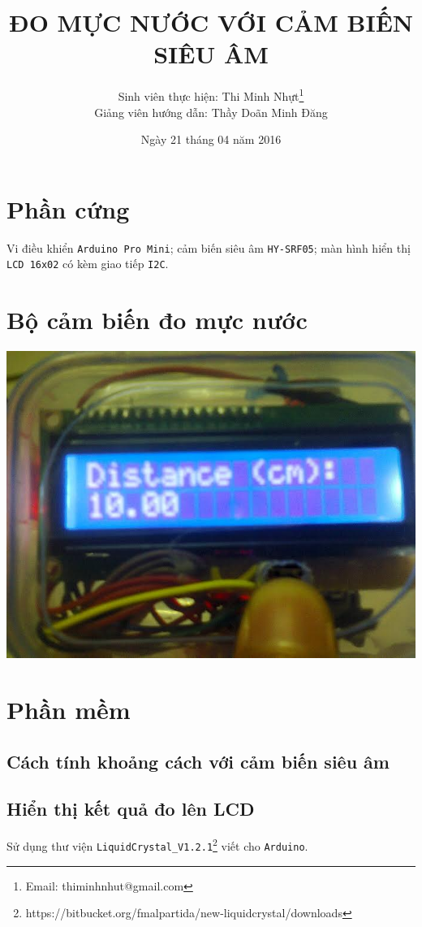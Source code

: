\documentclass[13pt,a4paper]{extarticle}
\begin{document}
\title{\textbf{ĐO MỰC NƯỚC VỚI CẢM BIẾN SIÊU ÂM}}
\author{Sinh viên thực hiện: Thi Minh Nhựt\thanks{\textsf{Email: thiminhnhut@gmail.com}}\\Giảng viên hướng dẫn: Thầy Doãn Minh Đăng}
\date{Ngày 21 tháng 04 năm 2016}
\maketitle
\section{Phần cứng}
Vi điều khiển \verb|Arduino Pro Mini|; cảm biến siêu âm \verb|HY-SRF05|; màn hình hiển thị \verb|LCD 16x02| có kèm giao tiếp \verb|I2C|.
\section{Bộ cảm biến đo mực nước}
\begin{center}
\includegraphics[scale=.25]{do-muc-nuoc-voi-cam-bien-sieu-am}
\end{center}
\section{Phần mềm}
\subsection{Cách tính khoảng cách với cảm biến siêu âm}

\subsection{Hiển thị kết quả đo lên LCD}
Sử dụng thư viện \verb|LiquidCrystal_V1.2.1|\footnote{\textsf{https://bitbucket.org/fmalpartida/new-liquidcrystal/downloads}} viết cho \verb|Arduino|.
\end{document}
